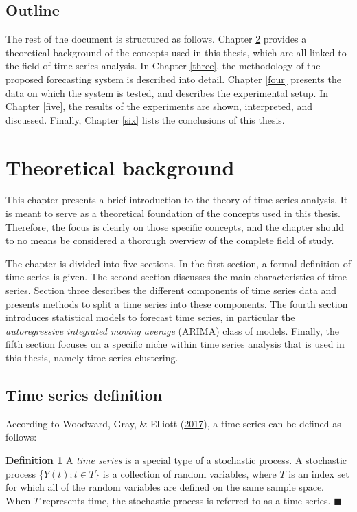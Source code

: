 \documentclass[12pt,oneside]{reedthesis}
\begin{document}
\section{Outline}\label{outline}

The rest of the document is structured as follows. Chapter \ref{two}
provides a theoretical background of the concepts used in this thesis,
which are all linked to the field of time series analysis. In Chapter
\ref{three}, the methodology of the proposed forecasting system is
described into detail. Chapter \ref{four} presents the data on which the
system is tested, and describes the experimental setup. In Chapter
\ref{five}, the results of the experiments are shown, interpreted, and
discussed. Finally, Chapter \ref{six} lists the conclusions of this
thesis.

\chapter{Theoretical background}\label{two}

This chapter presents a brief introduction to the theory of time series
analysis. It is meant to serve as a theoretical foundation of the
concepts used in this thesis. Therefore, the focus is clearly on those
specific concepts, and the chapter should to no means be considered a
thorough overview of the complete field of study.

The chapter is divided into five sections. In the first section, a
formal definition of time series is given. The second section discusses
the main characteristics of time series. Section three describes the
different components of time series data and presents methods to split a
time series into these components. The fourth section introduces
statistical models to forecast time series, in particular the
\emph{autoregressive integrated moving average} (ARIMA) class of models.
Finally, the fifth section focuses on a specific niche within time
series analysis that is used in this thesis, namely time series
clustering.

\section{Time series definition}\label{time-series-definition}

According to Woodward, Gray, \& Elliott
(\protect\hyperlink{ref-woodward2017}{2017}), a time series can be
defined as follows:

\textbf{Definition 1} A \emph{time series} is a special type of a
stochastic process. A stochastic process \{\(Y(t); t \in T\)\} is a
collection of random variables, where \(T\) is an index set for which
all of the random variables are defined on the same sample space. When
\(T\) represents time, the stochastic process is referred to as a time
series. \(\blacksquare\)
\end{document}
